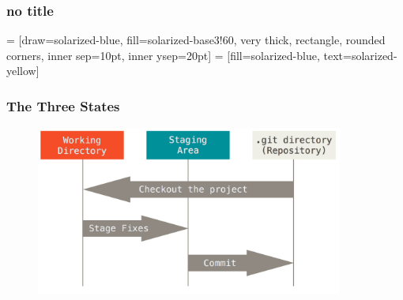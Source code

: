 \begin{frame}
    \frametitle{no title} %
     = [draw=solarized-blue, fill=solarized-base3!60, very thick,
        rectangle, rounded corners, inner sep=10pt, inner ysep=20pt]
     = [fill=solarized-blue, text=solarized-yellow]
\end{frame}

\begin{frame}
    \frametitle{The Three States}
    \begin{figure}[b]{\textwidth}
        \centering
        \includegraphics[width=0.9\textwidth]{../img/three_states.png}
    \end{figure}
\end{frame}

